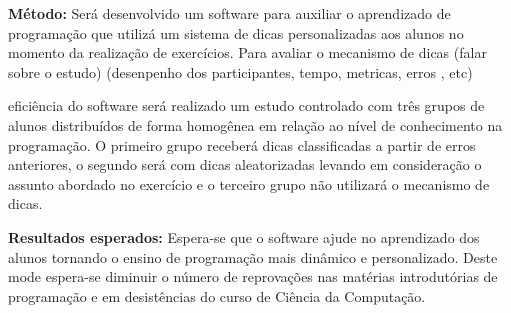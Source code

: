 \documentclass[12pt,english,brazil,a4paper,utf8,oneside]{utfpr-tcc}
\begin{document}
\begin{resumo}
\begin{itemize}
\end{itemize}

\textbf{Método:} Será desenvolvido um software para auxiliar o aprendizado de programação que utilizá um sistema de dicas personalizadas aos alunos no momento da realização de exercícios. Para avaliar o mecanismo de dicas (falar sobre o estudo) (desenpenho dos participantes, tempo, metricas, erros , etc)


 eficiência do software será realizado um estudo controlado com três grupos de alunos distribuídos de forma homogênea em relação ao nível de conhecimento na programação. O primeiro grupo receberá dicas classificadas a partir de erros anteriores, o segundo será com dicas aleatorizadas levando em consideração o assunto abordado no exercício e o terceiro grupo não utilizará o mecanismo de dicas.



\textbf{Resultados esperados:} Espera-se que o software ajude no aprendizado dos alunos tornando o ensino de programação mais dinâmico e personalizado. Deste mode espera-se diminuir o número de reprovações nas matérias introdutórias de programação e em desistências do curso de Ciência da Computação.

\end{resumo}







\listoffigures
\listoftables

\tableofcontents

\mainmatter



% 



\backmatter
\end{document}
